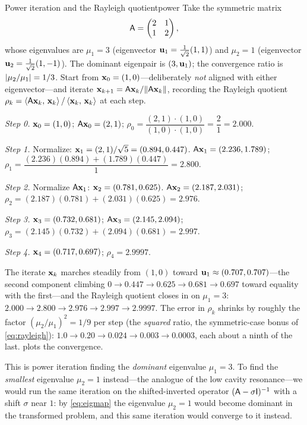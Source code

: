 \begin{workedexample}{Power iteration and the Rayleigh quotient}{power}
Take the symmetric matrix
\[
  \mathsf{A} = \begin{pmatrix} 2 & 1 \\ 1 & 2 \end{pmatrix},
\]
whose eigenvalues are $\mu_1=3$ (eigenvector $\mathbf{u}_1=\tfrac{1}{\sqrt2}(1,1)$) and
$\mu_2=1$ (eigenvector $\mathbf{u}_2=\tfrac{1}{\sqrt2}(1,-1)$). The dominant eigenpair is
$(3,\mathbf{u}_1)$; the convergence ratio is $\lvert\mu_2/\mu_1\rvert=1/3$. Start from
$\mathbf{x}_0=(1,0)$---deliberately \emph{not} aligned with either eigenvector---and
iterate $\mathbf{x}_{k+1}=\mathsf{A}\mathbf{x}_k/\lVert\mathsf{A}\mathbf{x}_k\rVert$, recording the Rayleigh
quotient $\rho_k=\left\langle \mathsf{A}\mathbf{x}_k,\, \mathbf{x}_k\right\rangle/\left\langle \mathbf{x}_k,\, \mathbf{x}_k\right\rangle$ at each step.

\medskip
\emph{Step 0.} $\mathbf{x}_0=(1,0)$;\;
$\mathsf{A}\mathbf{x}_0=(2,1)$;\;
$\rho_0 = \dfrac{(2,1)\cdot(1,0)}{(1,0)\cdot(1,0)} = \dfrac{2}{1} = 2.000$.

\emph{Step 1.} Normalize: $\mathbf{x}_1=(2,1)/\sqrt5=(0.894,0.447)$.\;
$\mathsf{A}\mathbf{x}_1=(2.236,1.789)$;\;
$\rho_1 = \dfrac{(2.236)(0.894)+(1.789)(0.447)}{1} = 2.800$.

\emph{Step 2.} Normalize $\mathsf{A}\mathbf{x}_1$: $\mathbf{x}_2=(0.781,0.625)$.\;
$\mathsf{A}\mathbf{x}_2=(2.187,2.031)$;\;
$\rho_2 = (2.187)(0.781)+(2.031)(0.625) = 2.976$.

\emph{Step 3.} $\mathbf{x}_3=(0.732,0.681)$;\;
$\mathsf{A}\mathbf{x}_3=(2.145,2.094)$;\;
$\rho_3 = (2.145)(0.732)+(2.094)(0.681) = 2.997$.

\emph{Step 4.} $\mathbf{x}_4=(0.717,0.697)$;\;
$\rho_4 = 2.9997$.

\medskip
The iterate $\mathbf{x}_k$ marches steadily from $(1,0)$ toward
$\mathbf{u}_1\approx(0.707,0.707)$---the second component climbing $0\to0.447\to0.625\to
0.681\to0.697$ toward equality with the first---and the Rayleigh quotient closes
in on $\mu_1=3$: $2.000\to2.800\to2.976\to2.997\to2.9997$. The error in $\rho_k$
shrinks by roughly the factor $(\mu_2/\mu_1)^2=1/9$ per step (the \emph{squared}
ratio, the symmetric-case bonus of \cref{eq:rayleigh}): $1.0\to0.20\to0.024\to
0.003\to0.0003$, each about a ninth of the last.  plots the
convergence.

This is power iteration finding the \emph{dominant} eigenvalue $\mu_1=3$. To find
the \emph{smallest} eigenvalue $\mu_2=1$ instead---the analogue of the low cavity
resonance---we would run the same iteration on the shifted-inverted operator
$(\mathsf{A}-\sigma\mathsf{I})^{-1}$ with a shift $\sigma$ near $1$: by \cref{eq:eigmap}
the eigenvalue $\mu_2=1$ would become dominant in the transformed problem, and
this same iteration would converge to it instead.
\end{workedexample}

